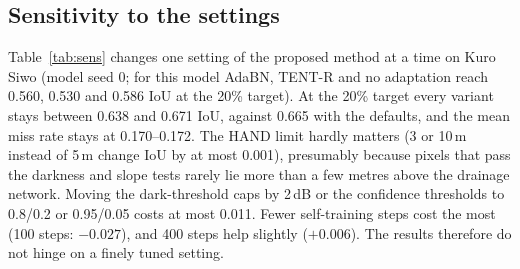 \begin{table}[pos=t]
\caption{MMFlood, internally planned test, 30 activations (U-Net, three models), same-dataset calibration: mean IoU at threshold 0.5, under the mean rule and under the per-flood rule, with the seed-averaged count of activations meeting the 20\% target under the per-flood rule. The Otsu row uses its own VV threshold. Under the mean rule at the 20\% target the realised mean miss rate is 0.172--0.177 for every method.}
\label{tab:mm}
\centering
\small

\end{table}

\subsection{Sensitivity to the settings}
Table~\ref{tab:sens} changes one setting of the proposed method at a time on Kuro Siwo (model seed 0; for this model AdaBN, TENT-R and no adaptation reach 0.560, 0.530 and 0.586 IoU at the 20\% target). At the 20\% target every variant stays between 0.638 and 0.671 IoU, against 0.665 with the defaults, and the mean miss rate stays at 0.170--0.172. The HAND limit hardly matters (3 or 10\,m instead of 5\,m change IoU by at most 0.001), presumably because pixels that pass the darkness and slope tests rarely lie more than a few metres above the drainage network. Moving the dark-threshold caps by 2\,dB or the confidence thresholds to 0.8/0.2 or 0.95/0.05 costs at most 0.011. Fewer self-training steps cost the most (100 steps: $-0.027$), and 400 steps help slightly ($+0.006$). The results therefore do not hinge on a finely tuned setting.

